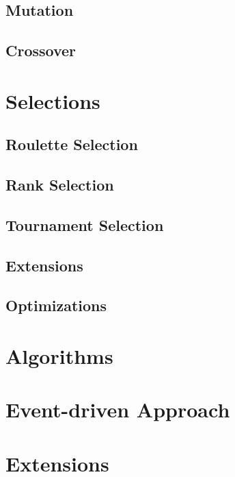 \subsection{Mutation}
\todo

\subsection{Crossover}
\todo

\section{Selections}
\todo

\subsection{Roulette Selection}
\todo

\subsection{Rank Selection}
\todo

\subsection{Tournament Selection}
\todo

\subsection{Extensions}
\todo

\subsection{Optimizations}
\todo

\section{Algorithms}
\todo

\section{Event-driven Approach}
\todo

\section{Extensions}
\todo
